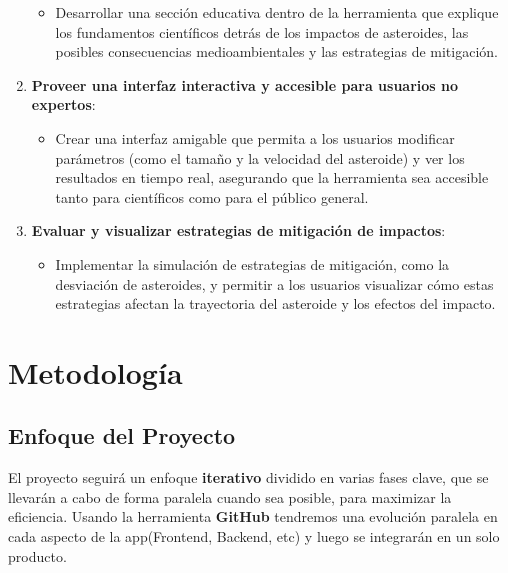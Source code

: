 \documentclass[conference]{IEEEtran}
\begin{document}
\begin{enumerate}
\begin{itemize}
		      \item{Desarrollar una sección educativa dentro de la herramienta
		            que explique los fundamentos científicos detrás de los
		            impactos de asteroides, las posibles consecuencias
		            medioambientales y las estrategias de mitigación.}
	      \end{itemize}
	\item\textbf{Proveer una interfaz interactiva y accesible para usuarios no expertos}:
	      \begin{itemize}
		      \item{Crear una interfaz amigable que permita a los usuarios
		            modificar parámetros (como el tamaño y la velocidad del
		            asteroide) y ver los resultados en tiempo real, asegurando que la
		            herramienta sea accesible tanto para científicos como para el
		            público general.}


	      \end{itemize}

	\item\textbf{Evaluar y visualizar estrategias de mitigación de impactos}:
	      \begin{itemize}
		      \item{Implementar la simulación de estrategias de mitigación,
		            como la desviación de asteroides, y permitir a los usuarios
		            visualizar cómo estas estrategias afectan la trayectoria del
		            asteroide y los efectos del impacto.}

	      \end{itemize}
\end{enumerate}

\section{Metodología}
\subsection{Enfoque del Proyecto}
El proyecto seguirá un enfoque \textbf{iterativo} dividido en varias fases
clave, que se llevarán a cabo de forma paralela cuando sea posible, para
maximizar la eficiencia. Usando la herramienta \textbf{GitHub} tendremos una
evolución paralela en cada aspecto de la app(Frontend, Backend, etc) y
luego se integrarán en un solo producto.
\end{document}
